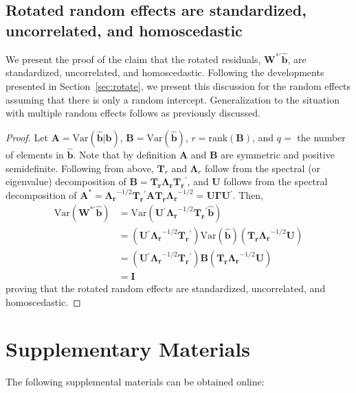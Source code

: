 \documentclass[12pt]{article} %
\newcommand{\trans}{\ensuremath{^\prime}}
\newcommand{\var}{\ensuremath{\mathrm{Var}}}
\begin{document}
\subsection{Rotated random effects are standardized, uncorrelated, and homoscedastic}

We present the proof of the claim that the rotated residuals, $\bm{W}^{*\prime} \widehat{\bm{b}}$, are standardized, uncorrelated, and homoscedastic. Following the developments presented in Section~\ref{sec:rotate}, we present this discussion for the random effects assuming that there is only a random intercept. Generalization to the situation with multiple random effects follows as previously discussed.

\begin{proof}
 Let $\bm{A} = \var(\widehat{\bm{b}} | \bm{b})$, $\bm{B} = \var(\widehat{\bm{b}})$, $r = \text{rank}(\bm{B})$, and $q = $ the number of elements in $\widehat{\bm{b}}$. Note that by definition $\bm{A}$ and $\bm{B}$ are symmetric and positive semidefinite. Following from above, $\bm{T}_r$ and $\bm{\Lambda}_r$ follow from the spectral (or eigenvalue) decomposition of $\bm{B} = \bm{T_r \Lambda_r T_r}\trans$, and $\bm{U}$ follows from the spectral decomposition of $\bm{A^*} = \bm{\Lambda_r}^{-1/2} \bm{T_r}\trans \bm{A T_r \Lambda_r}^{-1/2} = \bm{U} \bm{\Gamma} \bm{U}\trans$. Then, 
\begin{align*}
\var(\bm{W}^{*\prime} \widehat{\bm{b}}) &= \var(\bm{U}\trans \bm{\Lambda_r}^{-1/2} \bm{T_r}\trans \widehat{\bm{b}})\\
&= (\bm{U}\trans \bm{\Lambda_r}^{-1/2} \bm{T_r}\trans) \var(\widehat{\bm{b}}) (\bm{T_r \Lambda_r}^{-1/2} \bm{U})\\
&= (\bm{U}\trans \bm{\Lambda_r}^{-1/2} \bm{T_r}\trans) \bm{B} (\bm{T_r \Lambda_r}^{-1/2} \bm{U})\\
&= \bm{I}
\end{align*}
proving that the rotated random effects are standardized, uncorrelated, and homoscedastic.
\end{proof}


\section*{Supplementary Materials}

The following supplemental materials can be obtained online:
\end{document}
